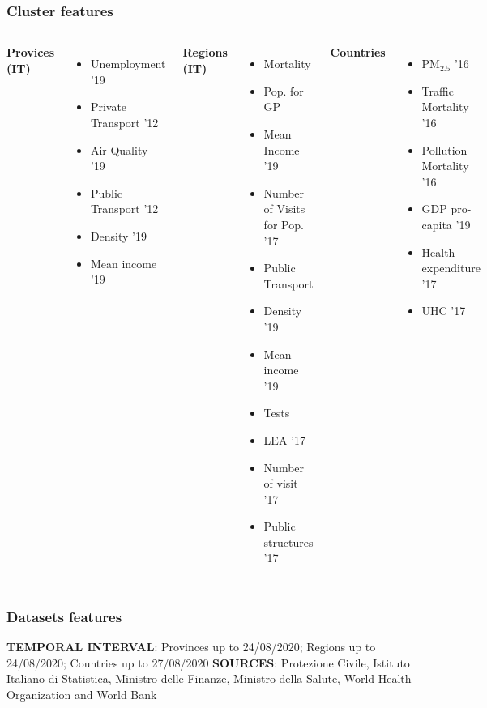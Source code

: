 \documentclass[compress]{beamer}
\begin{document}
\begin{frame}
\frametitle{Cluster features}
\begin{columns}
\textbf{Provices (IT)}
\begin{itemize}
\item Unemployment '19
\item Private Transport '12 
\item Air Quality '19
\item Public Transport '12
\item Density '19
\item Mean income '19
\end{itemize}
\textbf{Regions (IT)}
\begin{itemize}
\item Mortality
\item Pop. for GP
\item Mean Income '19
\item Number of Visits for Pop. '17
\item Public Transport 
\item Density '19
\item Mean income '19
\item Tests 
\item LEA '17
\item Number of visit '17
\item Public structures '17
\end{itemize}
\textbf{Countries}
\begin{itemize}
\item PM$_{2.5}$ '16
\item Traffic Mortality '16
\item Pollution Mortality '16
\item GDP pro-capita '19
\item Health expenditure '17
\item UHC '17
\end{itemize}
\end{columns}
\end{frame}

\begin{frame}
\frametitle{Datasets features }

\textbf{TEMPORAL INTERVAL}: Provinces up to 24/08/2020; Regions up to 24/08/2020; Countries up to 27/08/2020 
\newline
\newline
\textbf{SOURCES}: Protezione Civile, Istituto Italiano di Statistica, Ministro delle Finanze, Ministro della Salute, World Health Organization and World Bank 

\end{frame}
\end{document}
